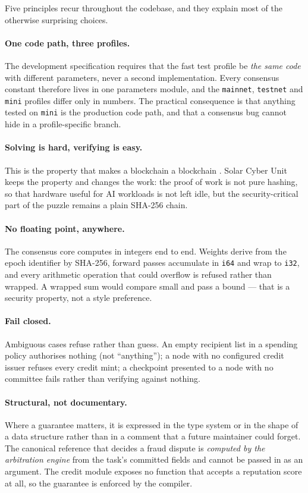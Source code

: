 \documentclass{article}
\begin{document}
Five principles recur throughout the codebase, and they explain most of the
otherwise surprising choices.

\paragraph{One code path, three profiles.} The development specification
requires that the fast test profile be \emph{the same code} with different
parameters, never a second implementation. Every consensus constant therefore
lives in one parameters module, and the \texttt{mainnet}, \texttt{testnet} and
\texttt{mini} profiles differ only in numbers. The practical consequence is that
anything tested on \texttt{mini} is the production code path, and that a
consensus bug cannot hide in a profile-specific branch.

\paragraph{Solving is hard, verifying is easy.} This is the property that makes
a blockchain a blockchain \cite{nakamoto2008bitcoin}. Solar Cyber Unit keeps the property
and changes the work: the proof of work is not pure hashing, so that hardware
useful for AI workloads is not left idle, but the security-critical part of the
puzzle remains a plain SHA-256 chain.

\paragraph{No floating point, anywhere.} The consensus core computes in integers
end to end. Weights derive from the epoch identifier by SHA-256, forward passes
accumulate in \texttt{i64} and wrap to \texttt{i32}, and every arithmetic
operation that could overflow is refused rather than wrapped. A wrapped sum
would compare small and pass a bound --- that is a security property, not a
style preference.

\paragraph{Fail closed.} Ambiguous cases refuse rather than guess. An empty
recipient list in a spending policy authorises nothing (not ``anything''); a
node with no configured credit issuer refuses every credit mint; a checkpoint
presented to a node with no committee fails rather than verifying against
nothing.

\paragraph{Structural, not documentary.} Where a guarantee matters, it is
expressed in the type system or in the shape of a data structure rather than in
a comment that a future maintainer could forget. The canonical reference that
decides a fraud dispute is \emph{computed by the arbitration engine} from the
task's committed fields and cannot be passed in as an argument. The credit
module exposes no function that accepts a reputation score at all, so the
guarantee is enforced by the compiler.
\end{document}
